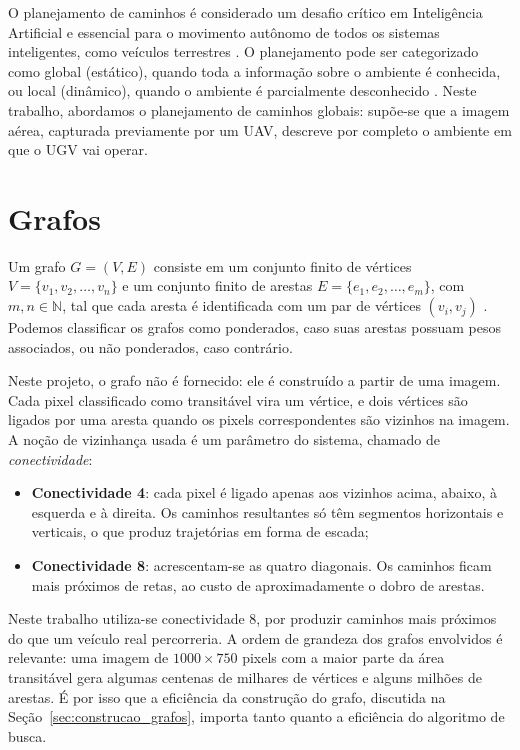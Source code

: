 \documentclass[
    12pt,
    openright,
    oneside,
    a4paper,
    english,
    brazil
]{abntex2}
\begin{document}
O planejamento de caminhos é considerado um desafio crítico em Inteligência Artificial e essencial para o movimento autônomo de todos os sistemas inteligentes, como veículos terrestres \cite{madridano2021}. O planejamento pode ser categorizado como global (estático), quando toda a informação sobre o ambiente é conhecida, ou local (dinâmico), quando o ambiente é parcialmente desconhecido \cite{chen2020}. Neste trabalho, abordamos o planejamento de caminhos globais: supõe-se que a imagem aérea, capturada previamente por um UAV, descreve por completo o ambiente em que o UGV vai operar.

\section{Grafos}

Um grafo $G = (V, E)$ consiste em um conjunto finito de vértices $V = \{v_1, v_2, \ldots, v_n\}$ e um conjunto finito de arestas $E = \{e_1, e_2, \ldots, e_m\}$, com $m, n \in \mathbb{N}$, tal que cada aresta é identificada com um par de vértices $(v_i, v_j)$ \cite{chen1997}. Podemos classificar os grafos como ponderados, caso suas arestas possuam pesos associados, ou não ponderados, caso contrário.

Neste projeto, o grafo não é fornecido: ele é construído a partir de uma imagem. Cada pixel classificado como transitável vira um vértice, e dois vértices são ligados por uma aresta quando os pixels correspondentes são vizinhos na imagem. A noção de vizinhança usada é um parâmetro do sistema, chamado de \emph{conectividade}:

\begin{itemize}
    \item \textbf{Conectividade 4}: cada pixel é ligado apenas aos vizinhos acima, abaixo, à esquerda e à direita. Os caminhos resultantes só têm segmentos horizontais e verticais, o que produz trajetórias em forma de escada;
    \item \textbf{Conectividade 8}: acrescentam-se as quatro diagonais. Os caminhos ficam mais próximos de retas, ao custo de aproximadamente o dobro de arestas.
\end{itemize}

Neste trabalho utiliza-se conectividade 8, por produzir caminhos mais próximos do que um veículo real percorreria. A ordem de grandeza dos grafos envolvidos é relevante: uma imagem de $1000 \times 750$ pixels com a maior parte da área transitável gera algumas centenas de milhares de vértices e alguns milhões de arestas. É por isso que a eficiência da construção do grafo, discutida na Seção~\ref{sec:construcao_grafos}, importa tanto quanto a eficiência do algoritmo de busca.
\end{document}

